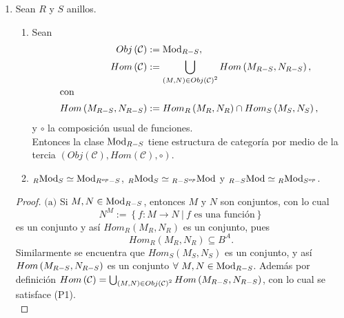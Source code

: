 \documentclass{article}
\newcommand{\lrprth}[1]{
	\left(#1\right)
}
\newcommand{\lrbrack}[1]{
	\left\{#1\right\}
}
\newcommand{\opst}[1]{
	{#1}^{op}
}
\newcommand{\ringmod}[3]{
	\if#3l
	{}_{#1}#2
	\else
	\if#3r
	#2_{#1}
	\fi
	\fi
}
\newcommand{\ringbimod}[4]{
	\if#4l
	{}_{#1-#2}#3
	\else
	\if#4r
	#3_{#1-#2}
	\else 
	\ifstrequal{#4}{lr}{
		{}_{#1}#3_{#2}
	}
	\fi
	\fi
}
\newcommand{\ringmodhom}[3]{
	Hom_{#1}\lrprth{#2,#3}
}
\theoremstyle{definition}
\theoremstyle{plain}
\theoremstyle{plain}
\theoremstyle{definition}
\theoremstyle{definition}
\theoremstyle{definition}
\theoremstyle{definition}
\theoremstyle{definition}
\theoremstyle{definition}
\begin{document}
\begin{enumerate}[label=\textbf{Ej \arabic*.}]
\begin{proof}
	Por el ejercicio 8, se tiene que si $M$ y $N$ son $R$-módulos derechos entonces son $R^{op}$ módulos izquierdos.Asi
	$\cdot$ es  una acción para $Hom_{R^{op}}(M,N)$ y por el ejercicio 8, $\cdot^{op}$ es una acción que vuelve a 
	$Hom_R(M,N)$ un módulo derecho.\\
\end{proof}
\item Sean $R$ y $S$ anillos.
\begin{enumerate}[label=(\alph*)]
	\item Sean 
	\begin{align*}
		Obj\lrprth{\mathcal{C}}&:=\ringbimod{R}{S}{\text{Mod}}{r},\\
		Hom\lrprth{\mathcal{C}}&:=\bigcup_{\lrprth{M,N}\in Obj\lrprth{\mathcal{C}}^2}Hom\lrprth{\ringbimod{R}{S}{M}{r},\ringbimod{R}{S}{N}{r}},\\
		\intertext{con}
		Hom\lrprth{\ringbimod{R}{S}{M}{r},\ringbimod{R}{S}{N}{r}}&:=Hom_R\lrprth{\ringmod{R}{M}{r},\ringmod{R}{N}{r}}\cap Hom_S\lrprth{\ringmod{S}{M}{r},\ringmod{S}{N}{r}},
	\end{align*}
	y $\circ$ la composición usual de funciones.\\ Entonces la clase $\ringbimod{R}{S}{\text{Mod}}{r}$ tiene estructura de categoría por medio de la tercia $\lrprth{Obj\lrprth{\mathcal{C}},Hom\lrprth{\mathcal{C}},\circ}$.
	\item $\ringbimod{R}{S}{\text{Mod}}{lr}\simeq\ringbimod{\opst{R}}{S}{\text{Mod}}{r}$, $\ringbimod{R}{S}{\text{Mod}}{lr}\simeq\ringbimod{R}{\opst{S}}{\text{Mod}}{l}$ y $\ringbimod{R}{S}{\text{Mod}}{l}\simeq\ringbimod{R}{\opst{S}}{\text{Mod}}{lr}$.
\end{enumerate}
\begin{proof}
	$\boxed{\text{(a)}}$ Si $M,N\in\ringbimod{R}{S}{\text{Mod}}{r}$, entonces $M$ y $N$ son conjuntos, con lo cual 
	\begin{equation*}
		N^M:=\lrbrack{f:M\rightarrow N\ |\ f\text{ es una función}}
	\end{equation*} 
    es un conjunto y así $\ringmodhom{R}{M_R}{N_R}$ es un conjunto, pues $$\ringmodhom{R}{M_R}{N_R}\subseteq B^A.$$
     Similarmente se encuentra que $\ringmodhom{S}{M_S}{N_S}$ es un conjunto, y así $Hom\lrprth{\ringbimod{R}{S}{M}{r},\ringbimod{R}{S}{N}{r}}$ es un conjunto $\forall\ M, N\in\ringbimod{R}{S}{\text{Mod}}{r}$. Además por definición $Hom\lrprth{\mathcal{C}}=\bigcup_{\lrprth{M,N}\in Obj\lrprth{\mathcal{C}}^2}Hom\lrprth{\ringbimod{R}{S}{M}{r},\ringbimod{R}{S}{N}{r}}$, con lo cual se satisface (P1).\\

\end{proof}
\end{enumerate}
\end{document}
